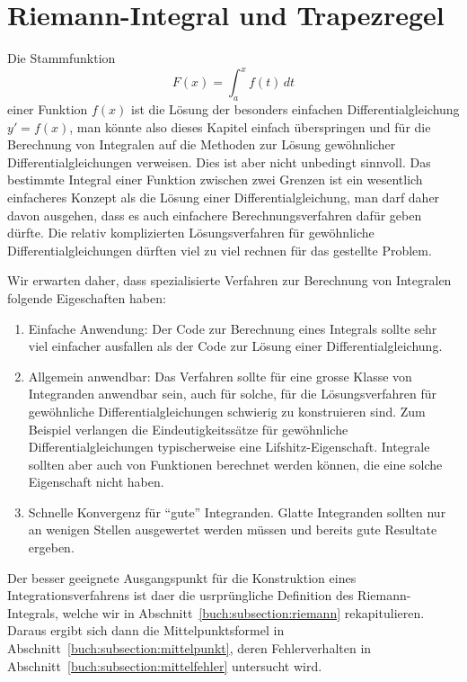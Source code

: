 %
%
%
\section{Riemann-Integral und Trapezregel
\label{buch:section:integraldefinition}}
Die Stammfunktion 
\[
F(x) =  \int_a^x f(t)\,dt
\]
einer Funktion $f(x)$ ist die Lösung der besonders einfachen
Differentialgleichung $y'=f(x)$, man könnte also dieses Kapitel
einfach überspringen und für die Berechnung von Integralen auf
die Methoden zur Lösung gewöhnlicher Differentialgleichungen
verweisen.
Dies ist aber nicht unbedingt sinnvoll.
Das bestimmte Integral einer Funktion zwischen zwei
Grenzen ist ein wesentlich einfacheres Konzept als die Lösung einer
Differentialgleichung, man darf daher davon ausgehen, dass es
auch einfachere Berechnungsverfahren dafür geben dürfte.
Die relativ komplizierten Lösungsverfahren für gewöhnliche
Differentialgleichungen dürften viel zu viel rechnen für das gestellte Problem.

Wir erwarten daher, dass spezialisierte Verfahren zur Berechnung von
Integralen folgende Eigeschaften haben:
\begin{enumerate}
\item Einfache Anwendung: Der Code zur Berechnung eines Integrals
sollte sehr viel einfacher ausfallen als der Code zur Lösung einer
Differentialgleichung.
\item Allgemein anwendbar: Das Verfahren sollte für eine grosse Klasse
von Integranden anwendbar sein, auch für solche, für die Lösungsverfahren
für gewöhnliche Differentialgleichungen schwierig zu konstruieren sind.
Zum Beispiel verlangen die Eindeutigkeitssätze für gewöhnliche
Differentialgleichungen typischerweise eine Lifshitz-Eigenschaft.
Integrale sollten aber auch von Funktionen berechnet werden können, die
eine solche Eigenschaft nicht haben.
\item Schnelle Konvergenz für ``gute'' Integranden.
Glatte Integranden sollten nur an wenigen Stellen ausgewertet werden müssen
und bereits gute Resultate ergeben.
\end{enumerate}
Der besser geeignete Ausgangspunkt für die Konstruktion eines 
Integrationsverfahrens ist daer die usrprüngliche Definition des
Riemann-Integrals, welche wir in Abschnitt~\ref{buch:subsection:riemann}
rekapitulieren.
Daraus ergibt sich dann die Mittelpunktsformel in
Abschnitt~\ref{buch:subsection:mittelpunkt}, deren Fehlerverhalten in
Abschnitt~\ref{buch:subsection:mittelfehler} untersucht wird.

